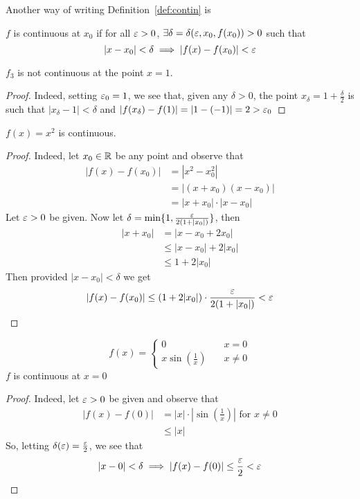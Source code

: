 Another way of writing Definition~\ref{def:contin} is
\begin{definition*}[32]
    $f$ is continuous at $x_0$ if for all $\varepsilon > 0$, $\exists\delta=\delta(\varepsilon, x_0, f(x_0)) > 0$ such that
    $$|x-x_0| < \delta \implies |f(x) - f(x_0)| < \varepsilon$$
\end{definition*}

\begin{example*}
    $f_3$ is not continuous at the point $x = 1$. 
\end{example*}
\begin{proof}
    Indeed, setting $\varepsilon_0 = 1$, 
    we see that, given any $\delta > 0$, the point $x_\delta = 1 + \frac{\delta}{2}$ is such that $|x_\delta - 1| < \delta$ and $|f(x_\delta) - f(1)| = |1-(-1)|=2 > \varepsilon_0$
\end{proof}

\begin{example*}
    $f(x) = x^2$ is continuous.
\end{example*}
\begin{proof}
    Indeed, let $x_0 \in \mathbb R$ be any point and observe that
    \begin{align*}
        |f(x) - f(x_0)| &= |x^2-x_0^2| \\
        &= |(x+x_0)(x-x_0)| \\
        &= |x+x_0|\cdot|x-x_0|
    \end{align*}
    Let $\varepsilon > 0$ be given. Now let $\delta = \min\{1, \frac{\varepsilon}{2(1+|x_0|)}\}$, then
     \begin{align*}
        |x+x_0| &= |x-x_0+2x_0| \\
        &\leq |x-x_0| + 2|x_0| \\
        &\leq 1 + 2|x_0|
    \end{align*}
    Then provided $|x - x_0| < \delta$ we get
    $$|f(x) - f(x_0)| \leq (1 + 2|x_0|)\cdot\frac{\varepsilon}{2(1 + |x_0|)} < \varepsilon$$
\end{proof}
\begin{example*}
\[ f(x) =
  \begin{cases}
    0       & \quad  x = 0\\
    x \sin\left(\frac{1}{x}\right)  & \quad x \neq 0
  \end{cases}
\]
$f$ is continuous at $x = 0$
\end{example*}
\begin{proof}
    Indeed, let $\varepsilon > 0$ be given and observe that 
    \begin{align*}
        |f(x) - f(0)| &= |x|\cdot\left|\sin\left(\frac{1}{x}\right)\right| \text{ for } x \neq 0 \\
        & \leq |x|
    \end{align*}
    So, letting $\delta(\varepsilon) = \frac{\varepsilon}{2}$, we see that
    $$|x-0| < \delta \implies |f(x)-f(0)| \leq \frac{\varepsilon}{2} < \varepsilon$$
\end{proof}

